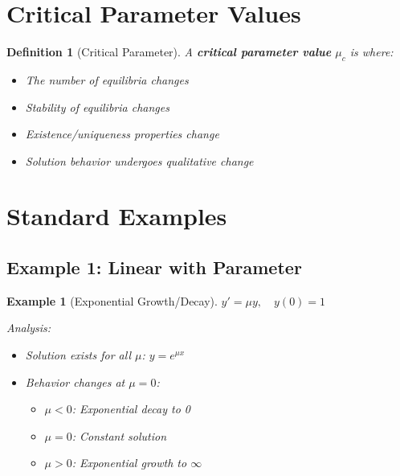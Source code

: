 \documentclass[12pt]{article}
\newtheorem{definition}{Definition}
\newtheorem{example}{Example}
\begin{document}
\section{Critical Parameter Values}

\begin{definition}[Critical Parameter]
A \textbf{critical parameter value} $\mu_c$ is where:
\begin{itemize}
    \item The number of equilibria changes
    \item Stability of equilibria changes
    \item Existence/uniqueness properties change
    \item Solution behavior undergoes qualitative change
\end{itemize}
\end{definition}

\section{Standard Examples}

\subsection{Example 1: Linear with Parameter}

\begin{example}[Exponential Growth/Decay]
$y' = \mu y, \quad y(0) = 1$

Analysis:
\begin{itemize}
    \item Solution exists for all $\mu$: $y = e^{\mu x}$
    \item Behavior changes at $\mu = 0$:
    \begin{itemize}
        \item $\mu < 0$: Exponential decay to 0
        \item $\mu = 0$: Constant solution
        \item $\mu > 0$: Exponential growth to $\infty$
    \end{itemize}
\end{itemize}
\end{example}

\begin{center}
\end{center}
\end{document}
